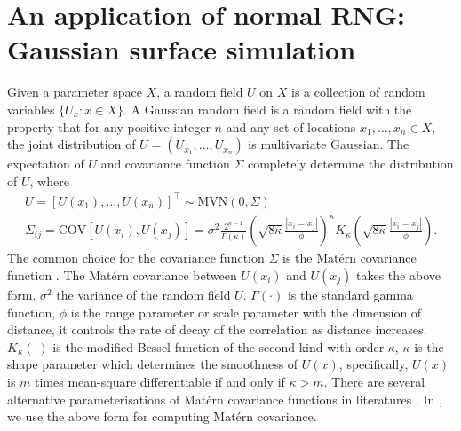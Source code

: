\documentclass[article,nojss]{jss}\usepackage[]{graphicx}\usepackage[]{color}
\def\cov{{\text{COV}}}
\begin{document}
\section{An application of normal RNG: Gaussian surface simulation} 
Given a parameter space $X$, a random field $U$ on $X$ is a collection of random variables $\{U_x :x\in X\}$. A Gaussian random field is a random field with the property that for any positive integer $n$ and any set of locations $x_1,\dots,x_n \in X$, the joint distribution of $U=(U_{x_1},\dots,U_{x_n})$ is multivariate Gaussian. The expectation of $U$ and covariance function $\Sigma$ completely determine the distribution of $U$, where 
\begin{gather*} 
U = [U(x_1), \ldots, U(x_n)]^\top \sim \text{MVN}(0, \Sigma) \\
\Sigma_{ij} = \cov[ U(x_i),U(x_j) ] = \sigma^2 \frac{2^{\kappa-1}}{\Gamma(\kappa)} \left(\sqrt{8\kappa} \frac{|x_i = x_j|}{\phi}\right)^\kappa  K_\kappa\left(\sqrt{8\kappa}  \frac{|x_i = x_j|}{\phi}\right).
\end{gather*}
The common choice for the covariance function $\Sigma$ is the Mat\'ern covariance function \citep{matern1960spatial}. The Mat\'ern covariance between $U(x_i)$ and $U(x_j)$ takes the above form.
$\sigma^2$ the variance of the random field $U$.
$\Gamma(\cdot)$ is the standard gamma function,  $\phi$ is the range parameter or scale parameter with the dimension of distance, it controls the rate of decay of the correlation as distance increases. $K_\kappa(\cdot)$ is the modified Bessel function of the second kind with order $\kappa$, $\kappa$ is the shape parameter which determines the smoothness of $U(x)$, specifically, $U(x)$ is $m$ times mean-square differentiable if and only if $\kappa > m$. %
There are several alternative parameterisations of Mat\'ern covariance functions in literatures  \citep[see][]{haskard2007anisotropic}. In , we use the above form for computing Mat\'ern covariance.
\end{document}
